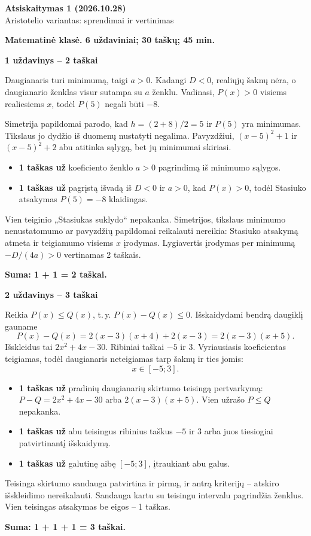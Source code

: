 \documentclass[11pt]{article}
\newcommand{\sk}[1]{\par\medskip\textbf{#1}\par}
\begin{document}
\setlength{\abovedisplayskip}{6pt}\setlength{\belowdisplayskip}{6pt}
\begin{center}\Large\textbf{Atsiskaitymas 1 (2026.10.28)}\\\large Aristotelio variantas: sprendimai ir vertinimas\end{center}
\textbf{Matematinė klasė. 6 uždaviniai; 30 taškų; 45 min.}

\sk{1 uždavinys -- 2 taškai}
Daugianaris turi minimumą, taigi $a>0$. Kadangi $D<0$, realiųjų šaknų nėra, o daugianario ženklas visur sutampa su $a$ ženklu. Vadinasi, $P(x)>0$ visiems realiesiems $x$, todėl $P(5)$ negali būti $-8$.

Simetrija papildomai parodo, kad $h=(2+8)/2=5$ ir $P(5)$ yra minimumas. Tikslaus jo dydžio iš duomenų nustatyti negalima. Pavyzdžiui, $(x-5)^2+1$ ir $(x-5)^2+2$ abu atitinka sąlygą, bet jų minimumai skiriasi.
\begin{itemize}
\item \textbf{1 taškas už} koeficiento ženklo $a>0$ pagrindimą iš minimumo sąlygos.
\item \textbf{1 taškas už} pagrįstą išvadą iš $D<0$ ir $a>0$, kad $P(x)>0$, todėl Stasiuko atsakymas $P(5)=-8$ klaidingas.
\end{itemize}
Vien teiginio „Stasiukas suklydo“ nepakanka. Simetrijos, tikslaus minimumo nenustatomumo ar pavyzdžių papildomai reikalauti nereikia: Stasiuko atsakymą atmeta ir teigiamumo visiems $x$ įrodymas. Lygiavertis įrodymas per minimumą $-D/(4a)>0$ vertinamas 2 taškais.\par\textbf{Suma: 1 + 1 = 2 taškai.}

\sk{2 uždavinys -- 3 taškai}
Reikia $P(x)\le Q(x)$, t.\,y. $P(x)-Q(x)\le0$. Išskaidydami bendrą daugiklį gauname
\[P(x)-Q(x)=2(x-3)(x+4)+2(x-3)=2(x-3)(x+5).\]
Išskleidus tai $2 x^{2} + 4 x - 30$. Ribiniai taškai $-5$ ir $3$. Vyriausiasis koeficientas teigiamas, todėl daugianaris neteigiamas tarp šaknų ir ties jomis:
\[\boxed{x\in[-5;3]}.\]
\begin{itemize}
\item \textbf{1 taškas už} pradinių daugianarių skirtumo teisingą pertvarkymą: $P-Q=2 x^{2} + 4 x - 30$ arba $2(x-3)(x+5)$. Vien užrašo $P\le Q$ nepakanka.
\item \textbf{1 taškas už} abu teisingus ribinius taškus $-5$ ir $3$ arba juos tiesiogiai patvirtinantį išskaidymą.
\item \textbf{1 taškas už} galutinę aibę $[-5;3]$, įtraukiant abu galus.
\end{itemize}
Teisinga skirtumo sandauga patvirtina ir pirmą, ir antrą kriterijų -- atskiro išskleidimo nereikalauti. Sandauga kartu su teisingu intervalu pagrindžia ženklus. Vien teisingas atsakymas be eigos -- 1 taškas.\par\textbf{Suma: 1 + 1 + 1 = 3 taškai.}\newpage
\end{document}
